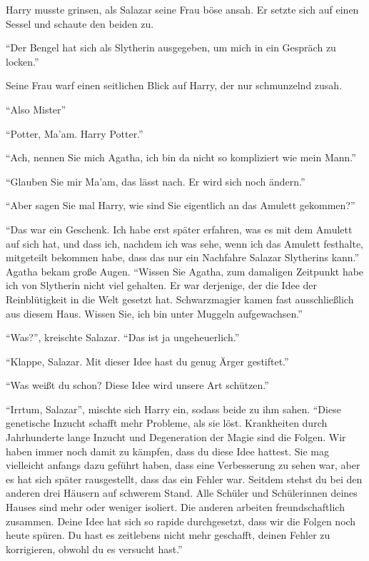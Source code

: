 Harry musste grinsen, als Salazar seine Frau böse ansah. Er setzte sich auf einen Sessel und schaute den beiden zu.

\enquote{Der Bengel hat sich als Slytherin ausgegeben, um mich in ein Gespräch zu locken.}

Seine Frau warf einen seitlichen Blick auf Harry, der nur schmunzelnd zusah.

\enquote{Also Mister\abs}

\enquote{Potter, Ma'am. Harry Potter.}

\enquote{Ach, nennen Sie mich Agatha, ich bin da nicht so kompliziert wie mein Mann.}

\enquote{Glauben Sie mir Ma'am, das lässt nach. Er wird sich noch ändern.}

\enquote{Aber sagen Sie mal Harry, wie sind Sie eigentlich an das Amulett gekommen?}

\enquote{Das war ein Geschenk. Ich habe erst später erfahren, was es mit dem Amulett auf sich hat, und dass ich, nachdem ich was sehe, wenn ich das Amulett festhalte, mitgeteilt bekommen habe, dass das nur ein Nachfahre Salazar Slytherins kann.} Agatha bekam große Augen. \enquote{Wissen Sie Agatha, zum damaligen Zeitpunkt habe ich von Slytherin nicht viel gehalten. Er war derjenige, der die Idee der Reinblütigkeit in die Welt gesetzt hat. Schwarzmagier kamen fast ausschließlich aus diesem Haus. Wissen Sie, ich bin unter Muggeln aufgewachsen.}

\enquote{Was?}, kreischte Salazar. \enquote{Das ist ja ungeheuerlich.}

\enquote{Klappe, Salazar. Mit dieser Idee hast du genug Ärger gestiftet.}

\enquote{Was weißt du schon? Diese Idee wird unsere Art schützen.}

\enquote{Irrtum, Salazar}, mischte sich Harry ein, sodass beide zu ihm sahen. \enquote{Diese genetische Inzucht schafft mehr Probleme, als sie löst. Krankheiten durch Jahrhunderte lange Inzucht und Degeneration der Magie sind die Folgen. Wir haben immer noch damit zu kämpfen, dass du diese Idee hattest. Sie mag vielleicht anfangs dazu geführt haben, dass eine Verbesserung zu sehen war, aber es hat sich später rausgestellt, dass das ein Fehler war. Seitdem stehst du bei den anderen drei Häusern auf schwerem Stand. Alle Schüler und Schülerinnen deines Hauses sind mehr oder weniger isoliert. Die anderen arbeiten freundschaftlich zusammen. Deine Idee hat sich so rapide durchgesetzt, dass wir die Folgen noch heute spüren. Du hast es zeitlebens nicht mehr geschafft, deinen Fehler zu korrigieren, obwohl du es versucht hast.}


